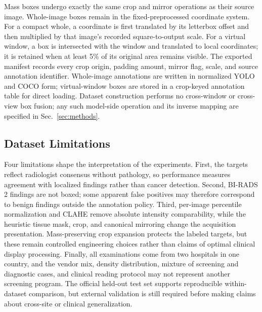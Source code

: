 Mass boxes undergo exactly the same crop and mirror operations as their source
image.  Whole-image boxes remain in the fixed-preprocessed coordinate system.
For a compact whole, a coordinate is first translated by its letterbox offset
and then multiplied by that image's recorded square-to-output scale.  For a
virtual window, a box is intersected with the window and translated to local
coordinates; it is retained when at least 5\% of its original area remains
visible.  The exported manifest records every crop origin, padding amount,
mirror flag, scale, and source annotation identifier.  Whole-image annotations
are written in normalized YOLO and COCO form; virtual-window boxes are stored
in a crop-keyed annotation table for direct loading.  Dataset construction
performs no cross-window or cross-view box fusion; any such model-side operation
and its inverse mapping are specified in Sec.~\ref{sec:methods}.

\subsection{Dataset Limitations}
\label{sec:dataset_limitations}

Four limitations shape the interpretation of the experiments.  First, the
targets reflect radiologist consensus without pathology, so performance
measures agreement with localized findings rather than cancer detection.
Second, BI-RADS 2 findings are not boxed; some apparent false positives may
therefore correspond to benign findings outside the annotation policy.  Third,
per-image percentile normalization and CLAHE remove absolute intensity
comparability, while the heuristic tissue mask, crop, and canonical mirroring
change the acquisition presentation.  Mass-preserving crop expansion protects
the labeled targets, but these remain controlled engineering choices rather
than claims of optimal clinical display processing.  Finally, all examinations
come from two hospitals in one country, and the vendor mix, density
distribution, mixture of screening and diagnostic cases, and clinical reading
protocol may not represent another screening program.  The official held-out
test set supports reproducible within-dataset comparison, but external
validation is still required before making claims about cross-site or clinical
generalization.
